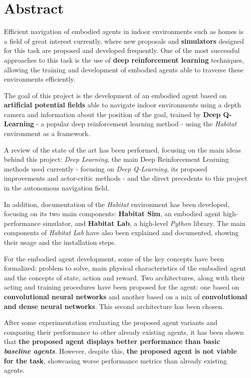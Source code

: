 \newpage

\chapter*{Abstract}

Efficient navigation of embodied agents in indoor environments such as homes is a field of great interest currently, where new proposals and \textbf{simulators} designed for this task are proposed and developed frequently. One of the most successful approaches to this task is the use of \textbf{deep reinforcement learning} techniques, allowing the training and development of embodied agents able to traverse these environments efficiently.

The goal of this project is the development of an embodied agent based on \textbf{artificial potential fields} able to navigate indoor environments using a depth camera and information about the position of the goal, trained by \textbf{Deep Q-Learning} - a popular deep reinforcement learning method - using the \textit{Habitat} environment as a framework.

A review of the state of the art has been performed, focusing on the main ideas behind this project: \textit{Deep Learning}, the main Deep Reinforcement Learning methods used currently - focusing on \textit{Deep Q-Learning}, its proposed improvements and actor-critic methods - and the direct precedents to this project in the autonomous navigation field.

In addition, documentation of the \textit{Habitat} environment has been developed, focusing on its two main components: \textbf{Habitat Sim}, an embodied agent high-performance simulator, and \textbf{Habitat Lab}, a high-level \textit{Python} library. The main components of \textit{Habitat Lab} have also been explained and documented, showing their usage and the installation steps.

For the embodied agent development, some of the key concepts have been formalized: problem to solve, main physical characteristics of the embodied agent and the concepts of state, action and reward. Two architectures, along with their acting and training procedures have been proposed for the agent: one based on \textbf{convolutional neural networks} and another based on a mix of \textbf{convolutional and dense neural networks}. This second architecture has been chosen.

After some experimentation evaluating the proposed agent variants and comparing their performance to other already existing agents, it has been shown that \textbf{the proposed agent displays better performance than basic \textit{baseline agents}}. However, despite this, \textbf{the proposed agent is not viable for the task}, showcasing worse performance metrics than already existing agents.

